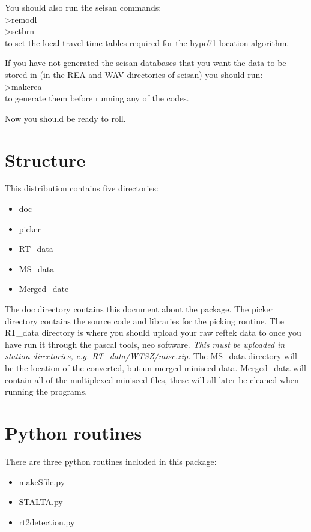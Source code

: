 \documentclass[a4paper,12pt,final]{article}
\begin{document}
You should also run the seisan commands:\\
>remodl\\
>setbrn\\
to set the local travel time tables required for the hypo71 location algorithm.

If you have not generated the seisan databases that you want the data to be stored in
(in the REA and WAV directories of seisan) you should run:\\
>makerea\\
to generate them before running any of the codes.

Now you should be ready to roll.

\section{Structure}

This distribution contains five directories:
\begin{itemize}
	\item doc
	\item picker
	\item RT\_data
	\item MS\_data
	\item Merged\_date
\end{itemize}

The doc directory contains this document about the package.  The picker directory contains
the source code and libraries for the picking routine.  The RT\_data directory is where
you should upload your raw reftek data to once you have run it through the pascal tools, 
neo software. \emph{This must be uploaded in station directories, e.g. RT\_data/WTSZ/misc.zip}.
The MS\_data directory will be the location of the converted, but un-merged
miniseed data.  Merged\_data will contain all of the multiplexed miniseed files, these will
all later be cleaned when running the programs.

\section{Python routines}

There are three python routines included in this package:
\begin{itemize}
	\item{makeSfile.py}
	\item{STALTA.py}
	\item{rt2detection.py}
\end{itemize}
\end{document}
